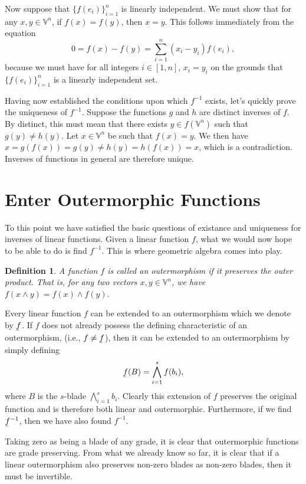 \documentclass[12pt]{article}
\newcommand{\V}{\mathbb{V}}
\newcommand{\uf}{\underaccent{\bar}{f}}
\newtheorem{definition}{Definition}[section]
\begin{document}
Now suppose that $\{f(e_i)\}_{i=1}^n$ is linearly independent.  We must show
that for any $x,y\in\V^n$, if $f(x)=f(y)$, then $x=y$.  This follows immediately
from the equation
\begin{equation*}
0 = f(x)-f(y) = \sum_{i=1}^n(x_i-y_i)f(e_i),
\end{equation*}
because we must have for all integers $i\in[1,n]$, $x_i=y_i$ on the grounds
that $\{f(e_i)\}_{i=1}^n$ is a linearly independent set.

Having now established the conditions upon which $f^{-1}$ exists, let's quickly
prove the uniqueness of $f^{-1}$.  Suppose the functions $g$ and $h$ are
distinct inverses of $f$.  By distinct, this must mean that there exists $y\in f(\V^n)$
such that $g(y)\neq h(y)$.  Let $x\in\V^n$ be such that $f(x)=y$.  We then
have $x=g(f(x))=g(y)\neq h(y)=h(f(x))=x$, which is a contradiction.
Inverses of functions in general are therefore unique.

\section{Enter Outermorphic Functions}

To this point we have satisfied the basic questions of existance and uniqueness
for inverses of linear functions.  Given a linear function $f$, what we
would now hope to be able to do is find $f^{-1}$.
This is where geometric algebra comes into play.
\begin{definition}
A function $f$ is called an outermorphism if it preserves
the outer product.  That is, for any two vectors $x,y\in\V^n$,
we have $f(x\wedge y)=f(x)\wedge f(y)$.
\end{definition}
Every linear function $f$ can be extended to an outermorphism which
we denote by $\uf$.  If $f$ does not already possess the defining
characteristic of an outermorphism, (i.e., $f\neq\uf$), then it can be
extended to an outermorphism by simply defining
\begin{equation*}
\uf(B) = \bigwedge_{i=1}^s f(b_i),
\end{equation*}
where $B$ is the $s$-blade $\bigwedge_{i=1}^s b_i$.  Clearly this extension of $f$ preserves the
original function and is therefore both linear and outermorphic.  Furthermore, if
we find $\uf^{-1}$, then we have also found $f^{-1}$.

Taking zero as being a blade of any grade, it is clear that outermorphic functions are
grade preserving.  From what we already know so far, it is clear that if a linear outermorphism
also preserves non-zero blades as non-zero blades, then it must be invertible.
\end{document}
